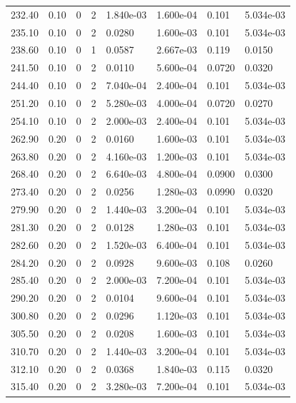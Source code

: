 \documentclass[preview]{standalone}
\begin{document}
{{{\begin{tabular}{L{1.2cm}C{1.2cm} C{0.3cm}C{0.5cm} C{1.4cm}C{1.4cm} C{1.4cm}C{1.4cm}}
  232.40  &  0.10  & 0     &  2 &  1.840e-03  & 1.600e-04  & 0.101 &  5.034e-03   \\ 
  235.10  &  0.10  & 0     &  2 &  0.0280  & 1.600e-03  & 0.101 &  5.034e-03   \\ 
  238.60  &  0.10  & 0     &  1 &  0.0587  & 2.667e-03  & 0.119 &  0.0150   \\ 
  241.50  &  0.10  & 0     &  2 &  0.0110  & 5.600e-04  & 0.0720 &  0.0320   \\ 
  244.40  &  0.10  & 0     &  2 &  7.040e-04  & 2.400e-04  & 0.101 &  5.034e-03   \\ 
  251.20  &  0.10  & 0     &  2 &  5.280e-03  & 4.000e-04  & 0.0720 &  0.0270   \\ 
  254.10  &  0.10  & 0     &  2 &  2.000e-03  & 2.400e-04  & 0.101 &  5.034e-03   \\ 
  262.90  &  0.20  & 0     &  2 &  0.0160  & 1.600e-03  & 0.101 &  5.034e-03   \\ 
  263.80  &  0.20  & 0     &  2 &  4.160e-03  & 1.200e-03  & 0.101 &  5.034e-03   \\ 
  268.40  &  0.20  & 0     &  2 &  6.640e-03  & 4.800e-04  & 0.0900 &  0.0300   \\ 
  273.40  &  0.20  & 0     &  2 &  0.0256  & 1.280e-03  & 0.0990 &  0.0320   \\ 
  279.90  &  0.20  & 0     &  2 &  1.440e-03  & 3.200e-04  & 0.101 &  5.034e-03   \\ 
  281.30  &  0.20  & 0     &  2 &  0.0128  & 1.280e-03  & 0.101 &  5.034e-03   \\ 
  282.60  &  0.20  & 0     &  2 &  1.520e-03  & 6.400e-04  & 0.101 &  5.034e-03   \\ 
  284.20  &  0.20  & 0     &  2 &  0.0928  & 9.600e-03  & 0.108 &  0.0260   \\ 
  285.40  &  0.20  & 0     &  2 &  2.000e-03  & 7.200e-04  & 0.101 &  5.034e-03   \\ 
  290.20  &  0.20  & 0     &  2 &  0.0104  & 9.600e-04  & 0.101 &  5.034e-03   \\ 
  300.80  &  0.20  & 0     &  2 &  0.0296  & 1.120e-03  & 0.101 &  5.034e-03   \\ 
  305.50  &  0.20  & 0     &  2 &  0.0208  & 1.600e-03  & 0.101 &  5.034e-03   \\ 
  310.70  &  0.20  & 0     &  2 &  1.440e-03  & 3.200e-04  & 0.101 &  5.034e-03   \\ 
  312.10  &  0.20  & 0     &  2 &  0.0368  & 1.840e-03  & 0.115 &  0.0320   \\ 
  315.40  &  0.20  & 0     &  2 &  3.280e-03  & 7.200e-04  & 0.101 &  5.034e-03   \\ 

\end{tabular}}}}
\end{document}
